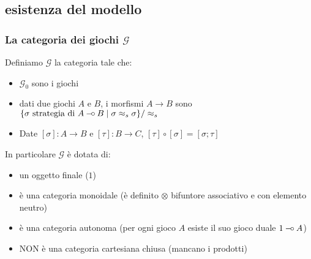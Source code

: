 \documentclass{beamer}
\newcommand{\limp}{\mathbin{{-}\mkern-3.5mu{\circ}}}
\begin{document}
\begin{frame}[t]
	
% 	
% 		
% 		
% 		
% 		
% 				
% 				
% 		
% 		
% 		
% 		
	

	
\end{frame}

\subsection{esistenza del modello}

\begin{frame}
 	
 	\frametitle{La categoria dei giochi $\mathcal{G}$}
 	
 	Definiamo $\mathcal{G}$ la categoria tale che:
 	\begin{itemize}
 		\item $\mathcal{G}_0$ sono i giochi
 		\item dati due giochi $A$ e $B$, i morfismi $A\rightarrow B$ sono $\{ \sigma \text{ strategia di } A\limp B \;|\; \sigma \approx_s \sigma \} / \approx_s$
 		\item Date $[\sigma] : A\rightarrow B$ e $[\tau] : B \rightarrow C$, $[\tau] \circ [\sigma] = [\sigma ; \tau]$
 	\end{itemize}
 	
 	In particolare $\mathcal{G}$ è dotata di:
 	\begin{itemize}
 		\item un oggetto finale ($1$)
 		\item è una categoria monoidale (è definito $\otimes$ bifuntore associativo e con elemento neutro)
 		\item è una categoria autonoma (per ogni gioco $A$ esiste il suo gioco duale $1 \limp A$)
 		\item NON è una categoria cartesiana chiusa (mancano i prodotti)
 	\end{itemize}
 	
 \end{frame}
\end{document}
